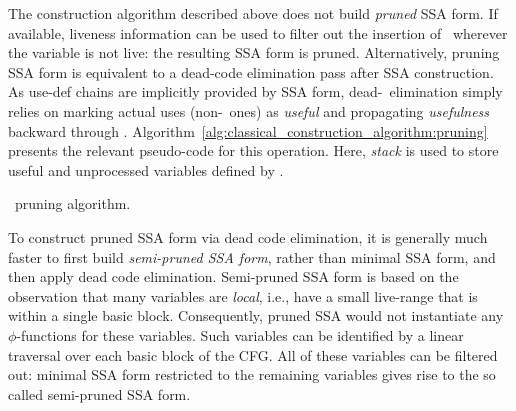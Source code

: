 {The construction algorithm described above does not
build \emph{pruned} SSA form.
If available, liveness information can be used to filter out the 
insertion of \phifuns\ wherever the variable is not live:
the resulting SSA form is pruned.
Alternatively, 
pruning SSA form is equivalent to a dead-code elimination pass
after SSA construction.
As use-def chains are implicitly provided by SSA form, 
dead-\phifun\ elimination simply relies on marking actual uses 
(non-\phifun\ ones) as \emph{useful} and propagating 
\emph{usefulness} backward through \phifuns.
Algorithm~\ref{alg:classical_construction_algorithm:pruning} 
presents the relevant pseudo-code for this operation. Here, \textit{stack} is used to store useful and unprocessed variables defined by \phifuns. 

\begin{algorithm}[h]
\caption{\label{alg:classical_construction_algorithm:pruning}
\phifun\ pruning algorithm.
}
\end{algorithm}

To construct pruned SSA form via dead code elimination,
it is generally much faster to first build \emph{semi-pruned SSA
form}, rather than minimal SSA form, and then apply
dead code elimination.
Semi-pruned SSA form is based on the observation that
many variables are \emph{local}, i.e., have a small live-range that is
within a single basic block. Consequently, pruned SSA would not 
instantiate any $\phi$-functions for these variables.
Such variables can be identified by a linear traversal
over each basic block of the CFG. 
All of these variables
can be filtered out: minimal SSA form restricted to the remaining variables gives rise to the so called semi-pruned SSA form.




}
